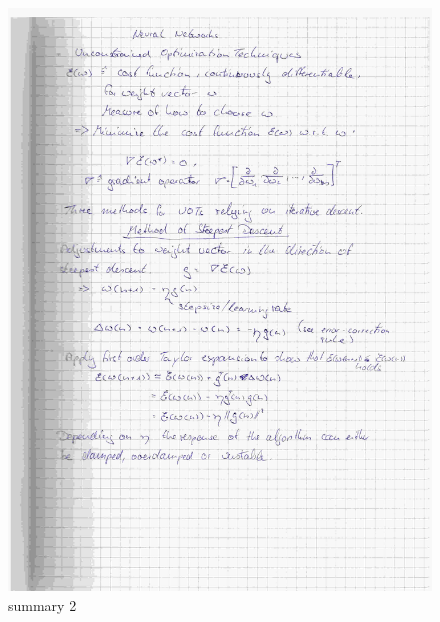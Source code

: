 \documentclass[paper=a4, fontsize=11pt]{scrartcl} %
\numberwithin{equation}{section} %
\numberwithin{figure}{section} %
\numberwithin{table}{section} %
\begin{document}
\begin{figure}[ht]
	\centering
  \includegraphics[width=0.7\textheight]{05.jpg}
	\caption{summary 2}
	\label{fig2}
\end{figure}
\end{document}
